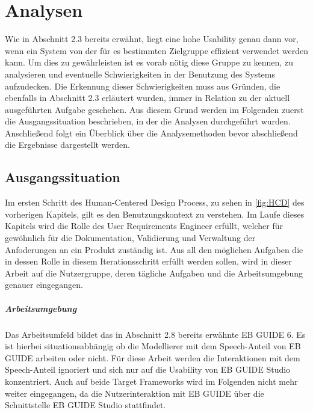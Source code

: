 \chapter{Analysen}\label{ch:method}

Wie in Abschnitt 2.3 bereits erwähnt, liegt eine hohe Usability genau dann vor, wenn ein System von der für es bestimmten Zielgruppe effizient verwendet werden kann.\cite{Richter.2016}
Um dies zu gewährleisten ist es vorab nötig diese Gruppe zu kennen, zu analysieren und eventuelle Schwierigkeiten in der Benutzung des Systems aufzudecken.
Die Erkennung dieser Schwierigkeiten muss aus Gründen, die ebenfalls in Abschnitt 2.3 erläutert wurden, immer in Relation zu der aktuell ausgeführten Aufgabe geschehen.
Aus diesem Grund werden im Folgenden zuerst die Ausgangssituation beschrieben,  in der die Analysen durchgeführt wurden.
Anschließend folgt ein Überblick über die Analysemethoden bevor abschließend die Ergebnisse dargestellt werden.

\section{Ausgangssituation}
Im ersten Schritt des Human-Centered Design Process, zu sehen in \cref{fig:HCD} des vorherigen Kapitels, gilt es den Benutzungskontext zu verstehen.
Im Laufe dieses Kapitels wird die Rolle des User Requirements Engineer erfüllt, welcher für gewöhnlich für die Dokumentation, Validierung und Verwaltung der Anfoderungen an ein Produkt zuständig ist.
Aus all den möglichen Aufgaben die in dessen Rolle in diesem Iterationsschritt erfüllt werden sollen, wird in dieser Arbeit auf die Nutzergruppe, deren tägliche Aufgaben und die Arbeitsumgebung genauer eingegangen.

\paragraph{Arbeitsumgebung}
Das Arbeitsumfeld bildet das in Abschnitt 2.8 bereits erwähnte EB GUIDE 6.
Es ist hierbei situationsabhängig ob die Modellierer mit dem Speech-Anteil von EB GUIDE arbeiten oder nicht.
Für diese Arbeit werden die Interaktionen mit dem Speech-Anteil ignoriert und sich nur auf die Usability von EB GUIDE Studio konzentriert.
Auch auf beide Target Frameworks wird im Folgenden nicht mehr weiter eingegangen, da die Nutzerinteraktion mit EB GUIDE über die Schnittstelle EB GUIDE Studio stattfindet.

